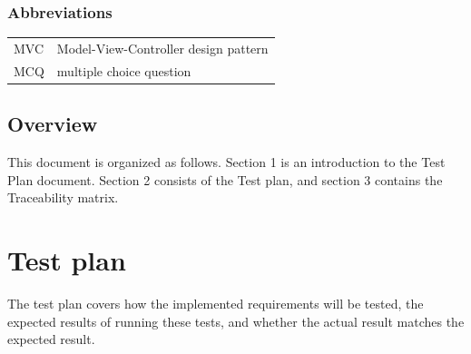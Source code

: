 \documentclass[12pt]{article}
\begin{document}
\subsubsection{Abbreviations}
\begin{center}
\begin{tabular}{p{5cm}p{12cm}}
MVC                         & Model-View-Controller design pattern \\[2em]
MCQ                         & multiple choice question
\end{tabular}
\end{center}

\subsection{Overview}
This document is organized as follows. Section 1 is an introduction to 
the Test Plan document. Section 2 consists of the Test plan, and 
section 3 contains the Traceability matrix.

\section{Test plan}
The test plan covers how the implemented requirements will be tested, 
the expected results of running these tests, and whether the actual 
result matches the expected result.
\end{document}
